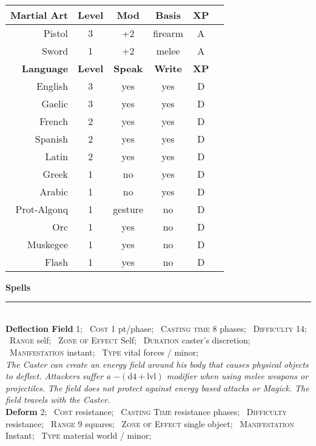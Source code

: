 \documentclass[11pt]{article}
\newcommand{\heading}[1]{{\sc\bfseries #1}}
\newcommand{\spell}[1]{{\sc\bfseries\large #1}}
\begin{document}
%
\ \ \ \ \
%
\begin{tabular}[t]{|r|c|c|c|c|c|}
\hline
%
%
\heading{Martial Art} & \heading{Level} & \heading{Mod} & \heading{Basis} & \heading{XP}
\\ \hline \hline
\sc Pistol & 3 & +2 & firearm & A
\\
\sc Sword & 1 & +2 & melee & A
\\[12pt] \hline \hline
%
\heading{Language} & \heading{Level} & \heading{Speak} & \heading{Write} & \heading{XP}
\\ \hline \hline
\sc English & 3 & yes & yes & D
\\
\sc Gaelic & 3 & yes & yes & D
\\
\sc French & 2 & yes & yes & D
\\
\sc Spanish & 2 & yes & yes & D
\\
\sc Latin & 2 & yes & yes & D
\\
\sc Greek & 1 & no & yes & D
\\
\sc Arabic & 1 & no & yes & D
\\
\sc Prot-Algonq & 1 & gesture & no & D
\\
\sc Orc & 1 & yes & no & D
\\
\sc Muskegee & 1 & yes & no & D
\\
\sc Flash & 1 & yes & no & D
\\ \hline
\end{tabular}

\clearpage
\noindent
{\sc\bfseries\Large Spells}
\vspace*{4pt}
\hrule
%
\mbox{ }
\\[12pt]
%
\spell{Deflection Field} 1;
\ \textsc{Cost} 1 pt/phase;
\ \textsc{Casting time} 8 phases;
\ \textsc{Difficulty} 14;
\ \textsc{Range} self;
\ \textsc{Zone of Effect} Self;
\ \textsc{Duration} caster's discretion;
\ \textsc{Manifestation} instant;
\ \textsc{Type} vital forces / minor;
\\
\noindent\textsl{The Caster can create an energy field around his body
  that causes physical objects to deflect. Attackers suffer a
  $- (\mathrm{d4} + \mathrm{lvl})$ modifier when using melee weapons
  or projectiles. The field does not protect against energy based
  attacks or Magick. The field travels with the Caster.}
%
\\[6pt]
%
\spell{Deform} 2;
\ \textsc{Cost} resistance;
\ \textsc{Casting Time} resistance phases;
\ \textsc{Difficulty} resistance;
\ \textsc{Range} 9 squares;
\ \textsc{Zone of Effect} single object;
\ \textsc{Manifestation} Instant;
\ \textsc{Type} material world / minor;
\end{document}
